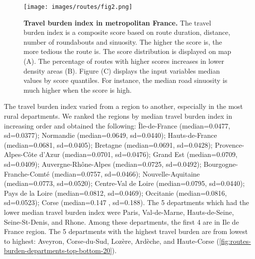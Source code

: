 \begin{figure}[h!]
    \texttt{[image: images/routes/fig2.png]}
    \centering
    \caption{
        \textbf{Travel burden index in metropolitan France.}
        The travel burden index is a composite score based on route duration,
        distance, number of roundabouts and sinuosity. The higher the score is,
        the more tedious the route is. The score distribution is displayed on
        map (A). The percentage of routes with higher scores increases in lower
        density areas (B). Figure (C) displays the input variables median values
        by score quantiles. For instance, the median road sinuosity is much
        higher when the score is high. }
    \label{fig:routes-burden-index}
\end{figure}

The travel burden index varied from a region to another, especially in the most
rural departments. We ranked the regions by median travel burden index in
increasing order and obtained the following: Île-de-France (median=0.0477,
sd=0.0377); Normandie (median=0.0649, sd=0.0440); Hauts-de-France
(median=0.0681, sd=0.0405); Bretagne (median=0.0691, sd=0.0428);
Provence-Alpes-Côte d'Azur (median=0.0701, sd=0.0476); Grand Est (median=0.0709,
sd=0.0409); Auvergne-Rhône-Alpes (median=0.0725, sd=0.0492);
Bourgogne-Franche-Comté (median=0.0757, sd=0.0466); Nouvelle-Aquitaine
(median=0.0773, sd=0.0520); Centre-Val de Loire (median=0.0795, sd=0.0440); Pays
de la Loire (median=0.0812, sd=0.0469); Occitanie (median=0.0816, sd=0.0523);
Corse (median=0.147 , sd=0.188). The 5 departments which had the lower median
travel burden index were Paris, Val-de-Marne, Hauts-de-Seine, Seine-St-Denis,
and Rhone. Among these departments, the first 4 are in Ile de France region. The
5 departments with the highest travel burden are from lowest to highest:
Aveyron, Corse-du-Sud, Lozère, Ardèche, and Haute-Corse
(\cref{fig:routes-burden-departments-top-bottom-20}).

